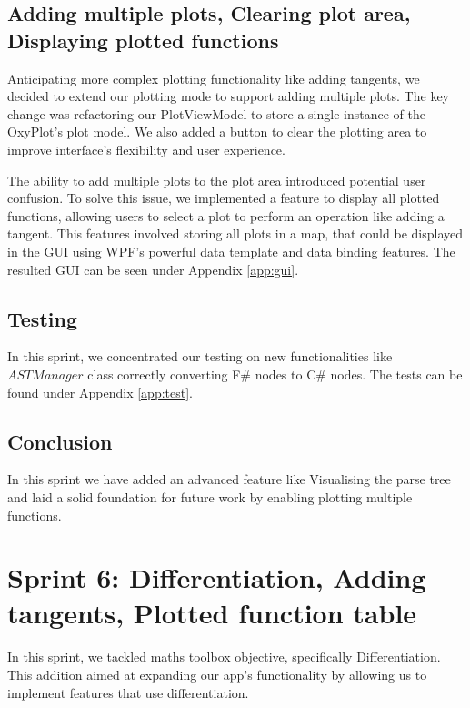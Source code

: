 \documentclass[a4paper, oneside, 11pt]{report}
\begin{document}
\subsection{Adding multiple plots, Clearing plot area, Displaying plotted functions}
Anticipating more complex plotting functionality like adding tangents, we decided to extend our plotting mode to support adding multiple plots. The key change was refactoring our PlotViewModel to store a single instance of the OxyPlot's plot model. We also added a button to clear the plotting area to improve interface's flexibility and user experience. 

The ability to add multiple plots to the plot area introduced potential user confusion. To solve this issue, we implemented a feature to display all plotted functions, allowing users to select a plot to perform an operation like adding a tangent. This features involved storing all plots in a map, that could be displayed in the GUI using WPF's powerful data template and data binding features. The resulted GUI can be seen under Appendix \ref{app:gui}.

\subsection{Testing}
In this sprint, we concentrated our testing on new functionalities like $ASTManager$ class correctly converting F\# nodes to C\# nodes. The tests can be found under Appendix \ref{app:test}.

\subsection{Conclusion}
In this sprint we have added an advanced feature like Visualising the parse tree and laid a solid foundation for future work by enabling plotting multiple functions.

\section{Sprint 6: Differentiation, Adding tangents, Plotted function table}
In this sprint, we tackled maths toolbox objective, specifically Differentiation. This addition aimed at expanding our app's functionality by allowing us to implement features that use differentiation.
\end{document}
